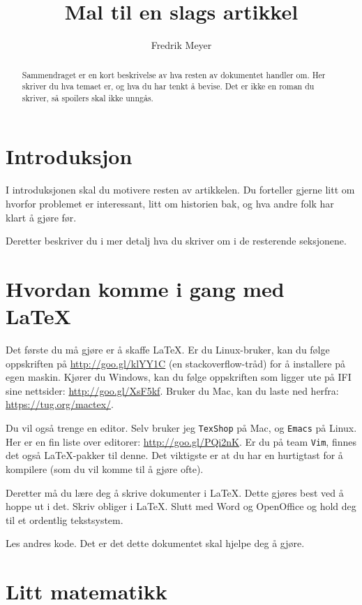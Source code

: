\documentclass[11pt, english, a4paper]{article}
\begin{document}
\title{Mal til en slags artikkel}
\author{Fredrik Meyer}
\maketitle 

\begin{abstract}
\noindent
Sammendraget er en kort beskrivelse av hva resten av dokumentet handler om. Her skriver du hva temaet er, og hva du har tenkt å bevise. Det er ikke en roman du skriver, så spoilers skal ikke unngås.
\end{abstract}

\section{Introduksjon}

I introduksjonen skal du motivere resten av artikkelen. Du forteller gjerne litt om hvorfor problemet er interessant, litt om historien bak, og hva andre folk har klart å gjøre før.

Deretter beskriver du i mer detalj hva du skriver om i de resterende seksjonene.  %

\section{Hvordan komme i gang med \LaTeX}

Det første du må gjøre er å skaffe \LaTeX. Er du Linux-bruker, kan du følge oppskriften på \url{http://goo.gl/klYY1C} (en stackoverflow-tråd) for å installere på egen maskin. Kjører du Windows, kan du følge oppskriften som ligger ute på IFI sine nettsider: \url{http://goo.gl/XsF5kf}. Bruker du Mac, kan du laste ned herfra: \url{https://tug.org/mactex/}.

Du vil også trenge en editor. Selv bruker jeg \texttt{TexShop} på Mac, og \texttt{Emacs} på Linux. Her er en fin liste over editorer: \url{http://goo.gl/PQi2nK}. Er du på team \texttt{Vim}, finnes det også \LaTeX-pakker til denne. Det viktigste er at du har en hurtigtast for å kompilere (som du vil komme til å gjøre ofte).

Deretter må du lære deg å skrive dokumenter i \LaTeX. Dette gjøres best ved å hoppe ut i det. Skriv obliger i \LaTeX. Slutt med Word og OpenOffice og hold deg til et ordentlig tekstsystem.

Les andres kode. Det er det dette dokumentet skal hjelpe deg å gjøre.

\section{Litt matematikk}
\end{document}
